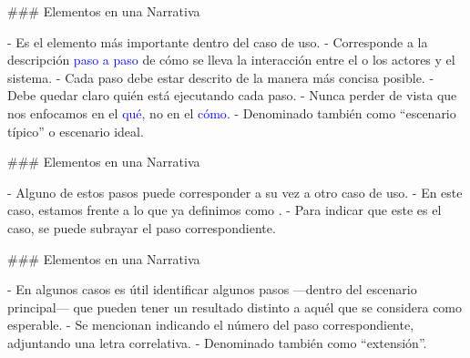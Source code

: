 ### Elementos en una Narrativa


- Es el elemento más importante dentro del caso de uso.
- Corresponde a la descripción \textcolor{blue}{paso a paso} de cómo se lleva la interacción
entre el o los actores y el sistema.
- Cada paso debe estar descrito de la manera más concisa posible.
- Debe quedar claro quién está ejecutando cada paso.
- Nunca perder de vista que nos enfocamos en el \textcolor{blue}{qué}, no en el \textcolor{blue}{cómo}.
- Denominado también como ``escenario típico'' o escenario ideal.

### Elementos en una Narrativa


- Alguno de estos pasos puede corresponder a su vez a otro caso de uso.
    - En este caso, estamos frente a lo que ya definimos como .
    - Para indicar que este es el caso, se puede subrayar el paso correspondiente.


### Elementos en una Narrativa


- En algunos casos es útil identificar algunos pasos ---dentro del escenario principal--- que
pueden tener un resultado distinto a aquél que se considera como esperable.
- Se mencionan indicando el número del paso correspondiente, adjuntando una letra correlativa.
- Denominado también como ``extensión''.

